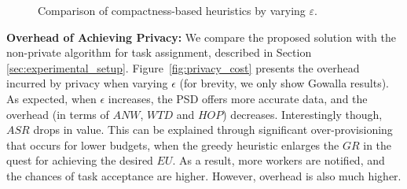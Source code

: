\documentclass{USC-Thesis}
\numberwithin{equation}{chapter}
\begin{document}
\begin{figure*}[!ht]
\begin{comment}
	\begin{minipage}[b]{0.195\linewidth}
	\centering
		\texttt{[image: exps/ye\_zi\_2\_cmp]}
		\subcaption{$\mathit{CMP}$, Ye.-Zipf}
		\label{fig:ye_zi_2_cmp}
	\end{minipage}
	\begin{minipage}[b]{0.195\linewidth}
	\centering
		\texttt{[image: exps/ye\_zi\_2\_hop]}
		\subcaption{$\mathit{HOP}$, Ye.-Zipf}
		\label{fig:ye_zi_2_hop}
	\end{minipage}
	\begin{minipage}[b]{0.195\linewidth}
	\centering
		\texttt{[image: exps/ye\_zi\_2\_anw]}
		\subcaption{$\mathit{ANW}$, Ye.-Zipf}
		\label{fig:ye_zi_2_anw}
	\end{minipage}
	\begin{minipage}[b]{0.195\linewidth}
		\centering
		\texttt{[image: exps/ye\_zi\_2\_atd1]}
		\subcaption{$\mathit{WTD1}$, Ye.-Zipf}
		\label{fig:ye_zi_2_atd1}
	\end{minipage}
	\begin{minipage}[b]{0.195\linewidth}
	\centering
		\texttt{[image: exps/ye\_zi\_2\_atd2]}
		\subcaption{$\mathit{WTD2}$, Ye.-Zipf}
		\label{fig:ye_zi_2_atd2}
	\end{minipage}
\end{comment}	
	\caption{Comparison of compactness-based heuristics by varying $\varepsilon$.}
\label{fig:compactness_heuristic}
\end{figure*}

\textbf{Overhead of Achieving Privacy:}
We compare the proposed solution with the non-private algorithm for task assignment, described in Section \ref{sec:experimental_setup}. Figure~\ref{fig:privacy_cost} presents the overhead incurred by privacy when varying $\epsilon$ (for brevity, we only show Gowalla results). As expected, when $\epsilon$ increases, the PSD offers more accurate data, and the overhead (in terms of $ANW$, $\mathit{WTD}$ and $\mathit{HOP}$) decreases.
Interestingly though, $\mathit{ASR}$ drops in value. This can be explained through significant over-provisioning that occurs for lower budgets, when the greedy heuristic enlarges the $\mathit{GR}$ in the quest for achieving the desired $\mathit{EU}$. As a result, more workers are notified, and the chances of task acceptance are higher. However, overhead is also much higher.
\end{document}
